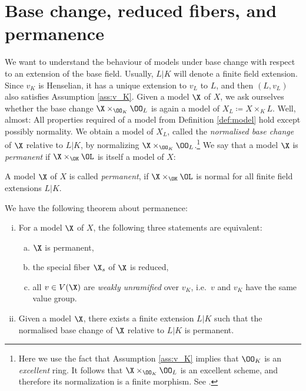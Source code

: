 \chapter{Base change, reduced fibers, and permanence}\label{ch:base-change-reduced-fibers-and-permanence}

We want to understand the behaviour of models under base change with respect to an extension of the base field.
Usually, $L|K$ will denote a finite field extension.
Since $v_K$ is Henselian, it has a unique extension to $v_L$ to $L$, and then $(L,v_L)$ also satisfies Assumption \ref{ass:v_K}.
Given a model $\X$ of $X$, we ask ourselves whether the base change $\X\times_{\OO_K}\OO_L$ is again a model of $X_L \coloneqq X\times_K L$.
Well, almost: All properties required of a model from Definition \ref{def:model} hold except possibly normality.
We obtain a model of $X_L$, called the {\em normalised base change} of $\X$ relative to $L|K$, by normalizing $\X\times_{\OO_K}\OO_L$.\footnote{
    Here we use the fact that Assumption \ref{ass:v_K} implies that $\OO_K$ is an \emph{excellent} ring.
    It follows that $\X\times_{\OO_K}\OO_L$ is an excellent scheme, and therefore its normalization is a finite morphism.
    See \cite[Chapter 8, in particular Theorem 8.2.39 (d)]{Liu}.
}
We say that a model $\X$ is \textit{permanent} if $\X \times_{\OK}\OL$ is itself a model of $X$:

\begin{definition} \label{def:permanent-model}
    A model $\X$ of $X$ is called \textit{permanent}, if $\X \times_{\OK} \OL$ is normal for all finite field extensions $L|K$.
\end{definition}

We have the following theorem about permanence:

\begin{theorem} \label{thm:permanence}
    \begin{enumerate}[(i)]
        \item For a model $\X$ of $X$,  the following three statements are equivalent:
            \begin{enumerate}[(a)]
                \item $\X$ is permanent,
                \item the special fiber $\X_s$ of $\X$ is reduced,
                \item all $v\in V(\X)$ are \emph{weakly unramified} over $v_K$, i.e.\ $v$ and $v_K$ have the same value group.
            \end{enumerate}
        \item Given a model $\X$, there exists a finite extension $L|K$ such that the normalised base change of $\X$ relative to $L|K$ is permanent.
    \end{enumerate}
\end{theorem}

